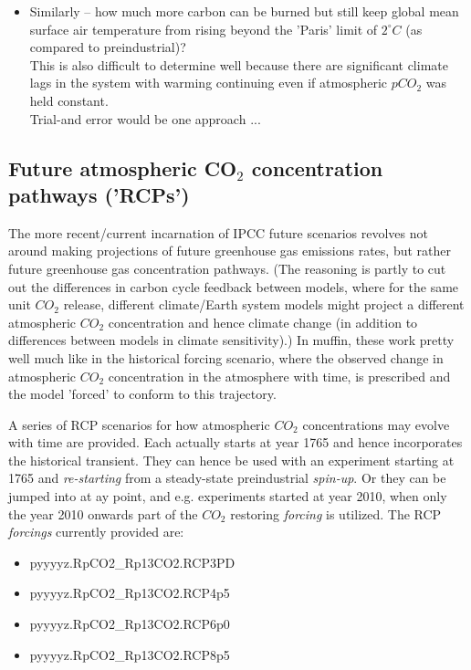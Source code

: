 \documentclass[11pt,fleqn]{book} %
\begin{document}
\begin{itemize}[noitemsep]
\vspace{1mm}
\item Similarly -- how much more carbon can be burned but still keep global mean surface air temperature from rising beyond the 'Paris' limit of \(2^{\circ}C\) (as compared to preindustrial)?
\\This is also difficult to determine well because there are significant climate lags in the system with warming continuing even if atmospheric \(pCO_{2}\) was held constant.
\\Trial-and error would be one approach ...

\end{itemize}


\subsection{Future atmospheric CO$_{2}$ concentration pathways ('RCPs')}

The more recent/current incarnation of IPCC future scenarios revolves not around  making projections of future greenhouse gas emissions rates, but rather future greenhouse gas concentration pathways. (The reasoning is partly to cut out the differences in carbon cycle feedback between models, where for the same unit \(CO_{2}\) release, different climate/Earth system models might project a different atmospheric \(CO_{2}\) concentration and hence climate change (in addition to differences between models in climate sensitivity).) In muffin, these work pretty well much like in the historical forcing scenario, where the observed change in atmospheric \(CO_{2}\) concentration in the atmosphere with time, is prescribed and the model 'forced' to conform to this trajectory.

A series of RCP scenarios for how atmospheric \(CO_{2}\) concentrations may evolve with time are provided. Each actually starts at year 1765 and hence incorporates the historical transient. They can hence be used with an experiment starting at 1765 and \textit{re-starting} from a steady-state preindustrial \textit{spin-up}. Or they can be jumped into at ay point, and e.g. experiments started at year 2010, when only the year 2010 onwards part of the \(CO_{2}\) restoring \textit{forcing} is utilized. The RCP \textit{forcings} currently provided are:

\newpage 

\vspace{2pt}
\begin{itemize}[noitemsep]
\setlength{\itemindent}{.2in}
\item \textsf{\footnotesize pyyyyz.RpCO2\_Rp13CO2.RCP3PD}
\item \textsf{\footnotesize pyyyyz.RpCO2\_Rp13CO2.RCP4p5}
\item \textsf{\footnotesize pyyyyz.RpCO2\_Rp13CO2.RCP6p0}
\item \textsf{\footnotesize pyyyyz.RpCO2\_Rp13CO2.RCP8p5}
\end{itemize}
\vspace{2pt}
\end{document}
